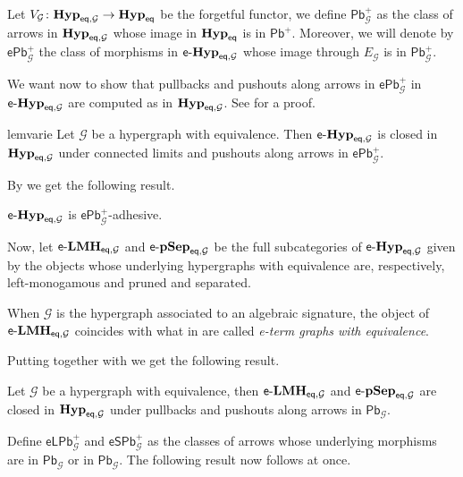 \documentclass[3p]{elsarticle}
\newcommand{\pbc}{\mathsf{Pb}}
\newcommand{\pbp}{\mathsf{Pb}^{+}}
\newcommand{\pbe}{\mathsf{ePb}^{+}}
\newcommand{\epbl}{\mathsf{eLPb}^{+}}
\newcommand{\epbs}{\mathsf{eSPb}^{+}}
\newcommand{\eq}{\mathsf{eq}}
\newcommand{\catname}[1]{\textbf{\textup{#1}}}
\newcommand{\hyp}{\catname{Hyp}}
\newcommand{\EqHyp}{\catname{Hyp}_{\mathsf{eq}}} %
\newcommand{\EqHyps}{\catname{Hyp}_{\mathsf{eq}, \mathcal{G}}}
\newcommand{\eggl}{\mathsf{e}\text{-}\catname{Hyp}_{\eq, \mathcal{G}}}
\newcommand{\lelm}{\mathsf{e}\text{-}\catname{LMH}_{\eq, \mathcal{G}}}
\newcommand{\leps}{\mathsf{e}\text{-}\catname{pSep}_{\eq, \mathcal{G}}}
\theoremstyle{remark}
\theoremstyle{definition}
\begin{document}
\begin{defi}
	Let $V_\mathcal{G}\colon \EqHyps\to \EqHyp$ be the forgetful functor, we define $\pbp_{\mathcal{G}}$ as the class of arrows in $\EqHyps$ whose image in $\EqHyp$ is in $\pbp$. Moreover, we will denote by 
	$\pbe_\mathcal{G}$ the class of morphisms in $\eggl$ whose image through $E_\mathcal{G}$ is in $\pbp_\mathcal{G}$.
\end{defi}

We want now to show that pullbacks and pushouts along arrows in $\pbe_\mathcal{G}$ in $\eggl$ are computed as in $\hyp_{\eq, \mathcal{G}}$. See  for a proof.


\begin{restatable}{lem}{varie}\label{prop:varie}
	Let $\mathcal{G}$ be a hypergraph with equivalence. Then $\eggl$ is closed in $\hyp_{\eq, \mathcal{G}}$ under connected limits and pushouts along arrows in $\pbe_\mathcal{G}$. 
\end{restatable}


By  we get the following result.

\begin{cor}\label{cor:eggade1}
	$\eggl$ is $\pbe_\mathcal{G}$-adhesive.
\end{cor}

Now, let $\lelm$ and $\leps$ be the full subcategories of $\eggl$ given by the objects whose underlying hypergraphs with equivalence are, respectively, left-monogamous and pruned and separated. 


\begin{rem}
When $\mathcal{G}$ is the hypergraph associated to an algebraic signature, the object of  $\lelm$ coincides with what in \cite{uovadesive} are called \emph{e-term graphs with equivalence}. 
\end{rem}

Putting together  with  we get the following result.

\begin{lem}Let $\mathcal{G}$ be a hypergraph with equivalence, then $\lelm$ and $\leps$ are closed in $\hyp_{\eq, \mathcal{G}}$ under pullbacks and pushouts along arrows in $\pbc_{\mathcal{G}}$.
\end{lem}

Define $\epbl_{\mathcal{G}}$ and $\epbs_{\mathcal{G}}$ as the classes of arrows whose underlying morphisms are in $\pbc_{\mathcal{G}}$ or in $\pbc_{\mathcal{G}}$. The following result now follows at once.
\end{document}

